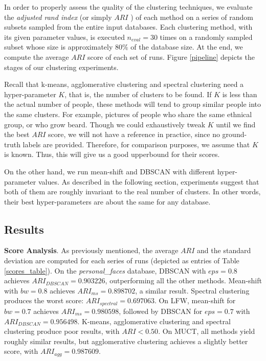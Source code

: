 \documentclass[conference]{IEEEtran}
\begin{document}
In order to properly assess the quality of the clustering techniques, we evaluate the \textit{adjusted rand index} (or simply $ARI$ \cite{??}) of each method on a series of random subsets sampled from the entire input databases.
Each clustering method, with its given parameter values, is executed $n_{eval} = 30$ times on a randomly sampled subset whose size is approximately $80\%$ of the database size.
At the end, we compute the average $ARI$ score of each set of runs.
Figure \ref{pipeline} depicts the stages of our clustering experiments.

Recall that k-means, agglomerative clustering and spectral clustering need a hyper-parameter $K$, that is, the number of clusters to be found.
If $K$ is less than the actual number of people, these methods will tend to group similar people into the same clusters.
For example, pictures of people who share the same ethnical group, or who grow beard.
Though we could exhaustively tweak $K$ until we find the best $ARI$ score, we will not have a reference in practice, since no ground-truth labels are provided.
Therefore, for comparison purposes, we assume that $K$ is known.
Thus, this will give us a good upperbound for their scores.

On the other hand, we run mean-shift and DBSCAN with different hyper-parameter values.
As described in the following section, experiments suggest that both of them are roughly invariant to the real number of clusters.
In other words, their best hyper-parameters are about the same for any database.

\subsection{Results}

\textbf{Score Analysis}. As previously mentioned, the average $ARI$ and the standard deviation are computed for each series of runs (depicted as entries of Table \ref{scores_table}).
On the \textit{personal\_faces} database, DBSCAN with $eps = 0.8$ achieves $ARI_{DBSCAN} = 0.903226$, outperforming all the other methods.
Mean-shift with $bw = 0.8$ achieves $ARI_{ms} = 0.898702$, a similar result.
Spectral clustering produces the worst score: $ARI_{spectral} = 0.697063$.
On LFW, mean-shift for $bw = 0.7$ achieves $ARI_{ms} = 0.980598$, followed by DBSCAN for $eps = 0.7$ with $ARI_{DBSCAN} = 0.956498$.
K-means, agglomerative clustering and spectral clustering produce poor results, with $ARI < 0.50$.
On MUCT, all methods yield roughly similar results, but agglomerative clustering achieves a slightly better score, with $ARI_{agg} = 0.987609$.
\end{document}

